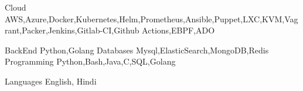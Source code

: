 

\begin{cvskills}

  \cvskill
    {Cloud} %
	{AWS,Azure,Docker,Kubernetes,Helm,Prometheus,Ansible,Puppet,LXC,KVM,Vagrant,Packer,Jenkins,Gitlab-CI,Github Actions,EBPF,ADO} %

  \cvskill
   {BackEnd} %
	{Python,Golang} %
  \cvskill
   {Databases} %
	{Mysql,ElasticSearch,MongoDB,Redis} %
  \cvskill
   {Programming} %
	{Python,Bash,Java,C,SQL,Golang} %

  \cvskill
    {Languages} %
	{English, Hindi} %

\end{cvskills}
